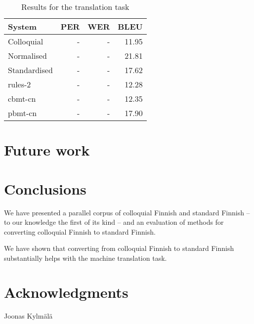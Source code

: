 \documentclass[11pt]{article}
\begin{document}
\begin{table}
  \centering
  \begin{tabular}{|l|r|r|r|}
     \hline
    \textbf{System} & \textbf{PER} & \textbf{WER} & \textbf{BLEU} \\
     \hline
     Colloquial & - & - & 11.95 \\
     Normalised & - & - & 21.81 \\
     Standardised & - & - & 17.62 \\
     \hline
     rules-2 & - & - & 12.28 \\
     cbmt-cn & - & - & 12.35 \\
     pbmt-cn & - & - & 17.90 \\
     \hline
  \end{tabular}
  \caption{Results for the translation task}
  \label{table:results-trad}
\end{table}

\section{Future work}

% 

\section{Conclusions}

We have presented a parallel corpus of colloquial Finnish and standard Finnish --
to our knowledge the first of its kind -- and an evaluation of methods for 
converting colloquial Finnish to standard Finnish. 

We have shown that converting from colloquial Finnish to standard Finnish substantially
helps with the machine translation task.


\section*{Acknowledgments}

Joonas Kylm\"{a}l\"{a}



\end{document}
